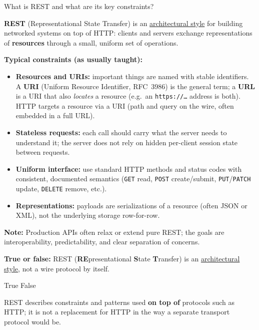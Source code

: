 \question[4]
What is REST and what are its key constraints?
\begin{solutionorbox}[1.00in]
  \textbf{REST} (Representational State Transfer) is an \uline{architectural style} for building networked systems on top of HTTP: clients and servers exchange representations of \textbf{resources} through a small, uniform set of operations.

  \noindent\textbf{Typical constraints (as usually taught):}
  \begin{itemize}
    \item \textbf{Resources and URIs:} important things are named with stable identifiers. A \textbf{URI} (Uniform Resource Identifier, RFC~3986) is the general term; a \textbf{URL} is a URI that also \emph{locates} a resource (e.g.\ an \texttt{https://\ldots} address is both). HTTP targets a resource via a URI (path and query on the wire, often embedded in a full URL).
    \item \textbf{Stateless requests:} each call should carry what the server needs to understand it; the server does not rely on hidden per-client session state between requests.
    \item \textbf{Uniform interface:} use standard HTTP methods and status codes with consistent, documented semantics (\texttt{GET} read, \texttt{POST} create/submit, \texttt{PUT}/\texttt{PATCH} update, \texttt{DELETE} remove, etc.).
    \item \textbf{Representations:} payloads are serializations of a resource (often JSON or XML), not the underlying storage row-for-row.
  \end{itemize}

  \noindent\textbf{Note:} Production APIs often relax or extend pure REST; the goals are interoperability, predictability, and clear separation of concerns.
\end{solutionorbox}

\question[4]
\textbf{True or false:} REST (\textbf{RE}presentational \textbf{S}tate \textbf{T}ransfer) is an \uline{architectural style}, not a wire protocol by itself.
\begin{choices}
  \CorrectChoice True
  \choice False
\end{choices}
\begin{solution}
  REST describes constraints and patterns used \textbf{on top of} protocols such as HTTP; it is not a replacement for HTTP in the way a separate transport protocol would be.
\end{solution}


